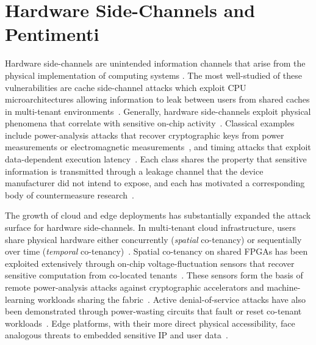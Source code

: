 \section{Hardware Side-Channels and Pentimenti}
\label{sec:bg-sidechannels}

Hardware side-channels are unintended information channels that arise
from the physical implementation of computing systems
\cite{spreitzer2017systematic, hu2020overview}. The most well-studied of
these vulnerabilities are cache side-channel attacks which exploit CPU
microarchitectures allowing information to leak between users from
shared caches in multi-tenant environments~\cite{yarom2014flush,
	lipp2018meltdown, kocher2020spectre}. Generally, hardware side-channels
exploit physical phenomena that correlate with sensitive on-chip
activity~\cite{wei2020scoverview, nordholt2020hardware}. Classical
examples include power-analysis attacks that recover cryptographic keys
from power measurements or electromagnetic
measurements~\cite{kocher1999differential, mangard2007power,
	clavier2014practical, quisquater2001electromagnetic, agrawal2002side},
and timing attacks that exploit data-dependent execution
latency~\cite{kocher1996timing, brumley2005remote}. Each class shares
the property that sensitive information is transmitted through a leakage
channel that the device manufacturer did not intend to expose, and each
has motivated a corresponding body of countermeasure research~\cite{
	barthe2018secure, ahmadi2023shield, zhang2024timing}.

The growth of cloud and edge deployments has substantially expanded the
attack surface for hardware side-channels. In multi-tenant cloud
infrastructure, users share physical hardware either concurrently
(\emph{spatial} co-tenancy) or sequentially over time (\emph{temporal}
co-tenancy)~\cite{ristenpart2009hey, zhang2014cloud, zhang2012crossvm}.
Spatial co-tenancy on shared FPGAs has been exploited extensively
through on-chip voltage-fluctuation sensors that recover sensitive
computation from co-located tenants~\cite{schellenberg2018remote,
	zhao2018fpga, gnad2017voltage, gnad2016analysis, schellenberg2018inside,
	ramesh2018fpga, giechaskiel2018leaky, giechaskiel2019leakier}. These
sensors form the basis of remote power-analysis attacks against
cryptographic accelerators and machine-learning workloads sharing the
fabric~\cite{schellenberg2018remote, gobulukoglu2021dac, kim2019make,
	mukhtar2018machine, bnn_power_side_channel}. Active denial-of-service
attacks have also been demonstrated through power-wasting circuits that
fault or reset co-tenant workloads~\cite{provelengios2020power,
	krautter2018fpgahammer, krautter2019active, krautter2019mitigating,
	nassar2021loopbreaker}. Edge platforms, with their more direct physical
accessibility, face analogous threats to embedded sensitive IP and user
data~\cite{tramer2016stealing, clements2022hardware, hu2016hardware,
	lu2020comprehensive}.

